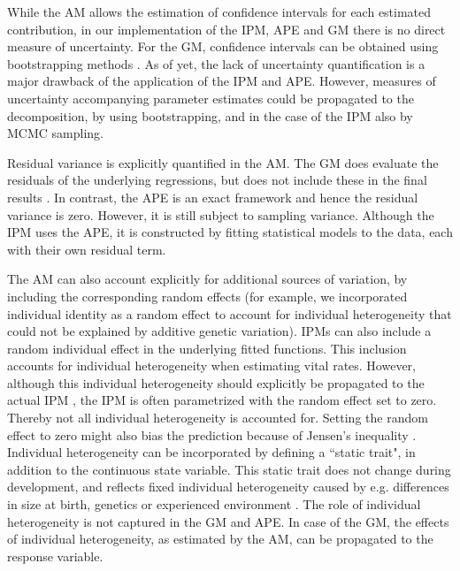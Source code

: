 While the AM allows the estimation of confidence intervals for each estimated contribution, in our implementation of the IPM, APE and GM there is no direct measure of uncertainty. For the GM, confidence intervals can be obtained using bootstrapping methods \parencite[as in][]{Ellner2011}. As of yet, the lack of uncertainty quantification is a major drawback of the application of the IPM and APE. However, measures of uncertainty accompanying parameter estimates could be propagated to the decomposition, by using bootstrapping, and in the case of the IPM also by MCMC sampling.

Residual variance is explicitly quantified in the AM. The GM does evaluate the residuals of the underlying regressions, but does not include these in the final results \parencite{Ellner2011}. In contrast, the APE is an exact framework and hence the residual variance is zero. However, it is still subject to sampling variance. Although the IPM uses the APE, it is constructed by fitting statistical models to the data, each with their own residual term. 

The AM can also account explicitly for additional sources of variation, by including the corresponding random effects (for example, we incorporated individual identity as a random effect to account for individual heterogeneity that could not be explained by additive genetic variation). IPMs can also include a random individual effect in the underlying fitted functions. This inclusion accounts for individual heterogeneity when estimating vital rates. However, although this individual heterogeneity should explicitly be propagated to the actual IPM \parencite{vindenes2015}, the IPM is often parametrized with the random effect set to zero. Thereby not all individual heterogeneity is accounted for. Setting the random effect to zero might also bias the prediction because of Jensen's inequality \parencite[e.g.][]{Fox2002}. Individual heterogeneity can be incorporated by defining a ``static trait", in addition to the continuous state variable. This static trait does not change during development, and reflects fixed individual heterogeneity caused by e.g. differences in size at birth, genetics or experienced environment \parencite[e.g.][]{Ellner2006,vindenes2015}. The role of individual heterogeneity is not captured in the GM and APE. In case of the GM, the effects of individual heterogeneity, as estimated by the AM, can be propagated to the response variable.

